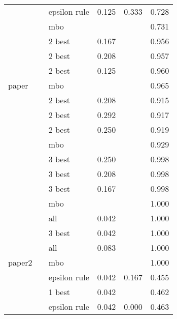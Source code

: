 \begin{table}
\begin{tabular}[t]{lrlrrr}
 &  & epsilon rule & 0.125 & 0.333 & 0.728\\

 & \multirow{-4}{*}{\raggedleft\arraybackslash 1000} & mbo &  &  & 0.731\\
\cmidrule{2-6}
 &  & 2 best & 0.167 &  & 0.956\\

 &  & 2 best & 0.208 &  & 0.957\\

 &  & 2 best & 0.125 &  & 0.960\\

\multirow{-12}{*}{\raggedright\arraybackslash paper} & \multirow{-4}{*}{\raggedleft\arraybackslash 2000} & mbo &  &  & 0.965\\
\cmidrule{1-6}
 &  & 2 best & 0.208 &  & 0.915\\

 &  & 2 best & 0.292 &  & 0.917\\

 &  & 2 best & 0.250 &  & 0.919\\

 & \multirow{-4}{*}{\raggedleft\arraybackslash 500} & mbo &  &  & 0.929\\
\cmidrule{2-6}
 &  & 3 best & 0.250 &  & 0.998\\

 &  & 3 best & 0.208 &  & 0.998\\

 &  & 3 best & 0.167 &  & 0.998\\

 & \multirow{-4}{*}{\raggedleft\arraybackslash 1000} & mbo &  &  & 1.000\\
\cmidrule{2-6}
 &  & all & 0.042 &  & 1.000\\

 &  & 3 best & 0.042 &  & 1.000\\

 &  & all & 0.083 &  & 1.000\\

\multirow{-12}{*}{\raggedright\arraybackslash paper2} & \multirow{-4}{*}{\raggedleft\arraybackslash 2000} & mbo &  &  & 1.000\\
\cmidrule{1-6}
 &  & epsilon rule & 0.042 & 0.167 & 0.455\\

 &  & 1 best & 0.042 &  & 0.462\\

 &  & epsilon rule & 0.042 & 0.000 & 0.463\\


\end{tabular}
\end{table}
